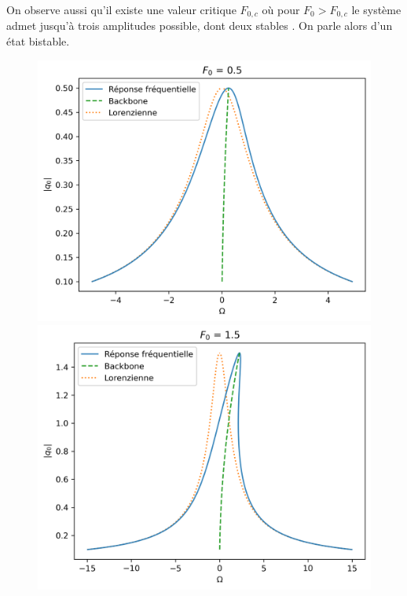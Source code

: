 On observe aussi qu'il existe une valeur critique $F_{0,c}$ où pour $F_0 > F_{0,c}$ le système admet 
jusqu'à trois amplitudes possible, dont deux stables \cite{landau_mechanics_1976}. On parle alors d'un état bistable.
%
\begin{figure}
    
    \begin{subcaptionblock}{.31\linewidth}
      \includegraphics[width=\linewidth]{images/duffing/F0=0.5.png}%
    \end{subcaptionblock}
    \begin{subcaptionblock}{.31\linewidth}
      \includegraphics[width=\linewidth]{images/duffing/F0=1.5.png}%

\end{subcaptionblock}
\end{figure}
